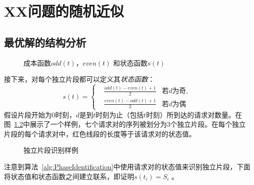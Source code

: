 \chapter{XX问题的随机近似}


\section{最优解的结构分析} \label{sec:3-optimal}

\begin{figure}[ht]
    \centering
    \begin{minipage}{0.7\textwidth}
    \end{minipage}
    \centering
    \begin{minipage}{0.7\textwidth}
        \subfloat[状态函数$s(t)$]{
             
            \label{fig:statefunction}
        }
    \end{minipage}
    \caption{成本函数$odd(t)$，$even(t)$ 和状态函数$s(t)$}
    \label{fig:Cost_State}
\end{figure}

接下来，对每个独立片段都可以定义其\emph{状态函数}：
\begin{equation*}
    s(t) = 
    \left\{
    \begin{aligned}
        & \frac{odd(t) - even(t) + 1}{2} & \text{若$d$为奇}, \\
        & \frac{even(t) - odd(t) + 1}{2} & \text{若$d$为偶}
    \end{aligned}
    \right.
\end{equation*}
假设片段开始为$0$时刻，$d$是到$t$时刻为止（包括$t$时刻）所到达的请求对数量。在图~\ref{fig:phase_partition}中展示了一个样例，七个请求对的序列被划分为$3$个独立片段。在每个独立片段的每个请求对中，红色线段的长度等于该请求对的状态值。

\begin{figure}[htb]
    \centering
    
    \caption{独立片段识别样例}
    \label{fig:phase_partition}
\end{figure}

注意到算法~\ref{alg:PhaseIdentification}中使用请求对的状态值来识别独立片段，下面将状态值和状态函数之间建立联系，即证明$s(t_i) = S_i$ 。



